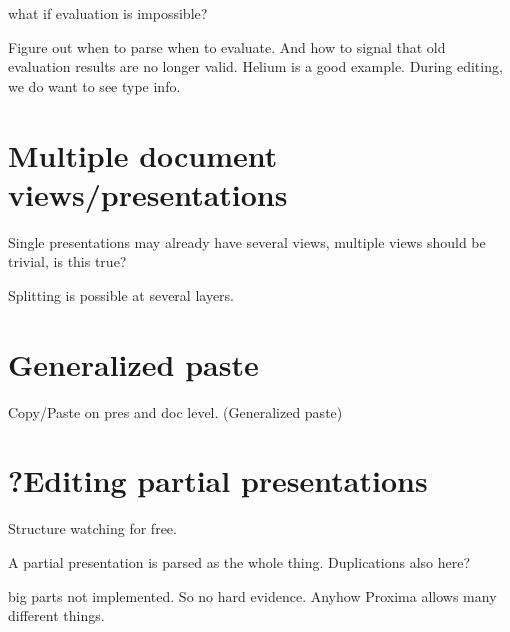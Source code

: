 \bc
what if evaluation is impossible?

Figure out when to parse when to evaluate. And how to signal that old evaluation results are no longer valid. Helium is a good example. During editing, we do want to see type info.

\section{Multiple document views/presentations}
 
Single presentations may already have several views, multiple views should be trivial, is  this true?

Splitting is possible at several layers.

\section{Generalized paste}    %

Copy/Paste on pres and doc level. (Generalized paste)

\section{?Editing partial presentations}

Structure watching for free.

A partial presentation is parsed as the whole thing. Duplications also here?

big parts not implemented. So no hard evidence. Anyhow Proxima allows many different  things. 
\ec